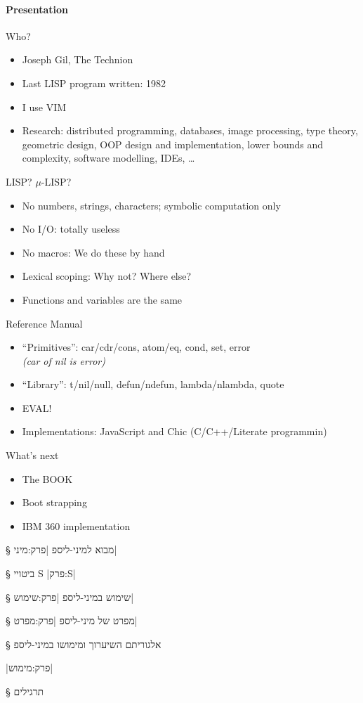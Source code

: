 \begin{LTR}
\paragraph{Presentation}

Who?
\begin{itemize}
\item Joseph Gil, The Technion
\item Last LISP program written: 1982
\item I use VIM
\item Research: distributed programming, databases, image processing, type
theory, geometric design, OOP design and implementation, lower bounds and complexity,
  software modelling, IDEs, … 
\end{itemize}


LISP? $μ$-LISP? 
\begin{itemize}
\item No numbers, strings, characters; symbolic computation only
\item No I/O: totally useless 
\item No macros: We do these by hand
\item Lexical scoping: Why not? Where else?
\item Functions and variables are the same
\end{itemize}

Reference Manual
\begin{itemize}
\item ``Primitives'': car/cdr/cons, atom/eq, cond, set, error
\\{\small\itshape (car of nil is error)}
\item ``Library'': t/nil/null, defun/ndefun, lambda/nlambda, quote
\item  EVAL!
\item Implementations: JavaScript and Chic (C/C++/Literate programmin)
\end{itemize}

What's next
\begin{itemize}
\item The BOOK 
\item Boot strapping
\item IBM 360 implementation
\end{itemize}
\end{LTR}


§ מבוא למיני-ליספ 
|פרק:מיני|


§ ביטויי S 
|פרק:S|


§ שימוש במיני-ליספ 
|פרק:שימוש|


§ מפרט של מיני-ליספ
|פרק:מפרט|


§ אלגוריתם השיערוך ומימושו במיני-ליספ 

|פרק:מימוש|

§ תרגילים


